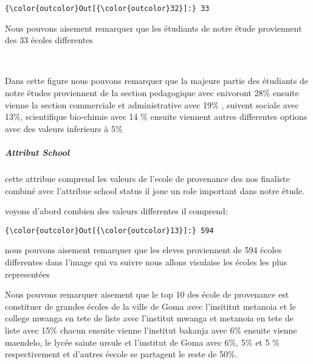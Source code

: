 \documentclass[11pt]{article}
\begin{document}
            \begin{Verbatim}[commandchars=\\\{\}]
{\color{outcolor}Out[{\color{outcolor}32}]:} 33
\end{Verbatim}
        
    Nous pouvons aisement remarquer que les étudiants de notre étude
proviennent des 33 écoles differentes

    \begin{center}
    \end{center}
    { \hspace*{\fill} \\}
    
    Dans cette figure nous pouvons remarquer que la majeure partie des
étudiants de notre études proviennent de la section pedagogique avec
enivoront 28\% ensuite vienne la section commerciale et administrative
avec 19\% , suivent sociale avec 13\%, scientifique bio-chimie avec 14
\% ensuite viennent autres differentes options avec des valeurs
inferieurs à 5\%

    \subparagraph{Attribut School}\label{attribut-school}

    cette attribue comprend les valeurs de l'ecole de provenance des nos
finaliste combiné avec l'attribue school status il joue un role
important dans notre étude.

    voyons d'abord combien des valeurs differentes il comprend:

            \begin{Verbatim}[commandchars=\\\{\}]
{\color{outcolor}Out[{\color{outcolor}13}]:} 594
\end{Verbatim}
        
    nous pouvons aisement remarquer que les eleves proviennent de 594 écoles
differentes dans l'image qui va suivre nous allons visulaise les écoles
les plus representées

    Nous pouvons remarquer aisement que le top 10 des école de provenance
est constituer de grandes écoles de la ville de Goma avec l'insititut
metanoia et le college mwanga en tete de liste avec l'institut mwanga et
metanoia en tete de liste avec 15\% chacun ensuite vienne l'institut
bakanja avec 6\% ensuite vienne maendelo, le lycée sainte ursule et
l'institut de Goma avec 6\%, 5\% et 5 \% respectivement et d'autres
éecole se partagent le reste de 50\%.
\end{document}
